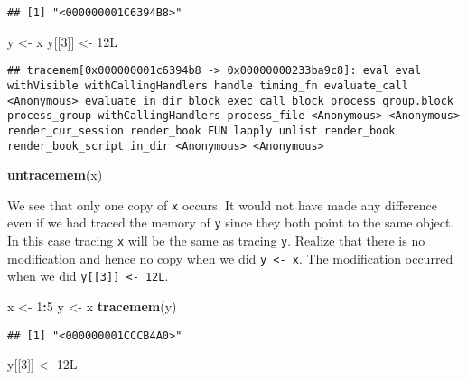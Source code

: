 \documentclass[]{book}
\newenvironment{Shaded}{\begin{snugshade}}{\end{snugshade}}
\newcommand{\DecValTok}[1]{\textcolor[rgb]{0.00,0.00,0.81}{#1}}
\newcommand{\KeywordTok}[1]{\textcolor[rgb]{0.13,0.29,0.53}{\textbf{#1}}}
\newcommand{\NormalTok}[1]{#1}
\newcommand{\OperatorTok}[1]{\textcolor[rgb]{0.81,0.36,0.00}{\textbf{#1}}}
\newcommand{\StringTok}[1]{\textcolor[rgb]{0.31,0.60,0.02}{#1}}
\begin{document}
\begin{verbatim}
## [1] "<000000001C6394B8>"
\end{verbatim}

\begin{Shaded}
\begin{Highlighting}[]
\NormalTok{y <-}\StringTok{ }\NormalTok{x}
\NormalTok{y[[}\DecValTok{3}\NormalTok{]] <-}\StringTok{ }\NormalTok{12L}
\end{Highlighting}
\end{Shaded}

\begin{verbatim}
## tracemem[0x000000001c6394b8 -> 0x00000000233ba9c8]: eval eval withVisible withCallingHandlers handle timing_fn evaluate_call <Anonymous> evaluate in_dir block_exec call_block process_group.block process_group withCallingHandlers process_file <Anonymous> <Anonymous> render_cur_session render_book FUN lapply unlist render_book render_book_script in_dir <Anonymous> <Anonymous>
\end{verbatim}

\begin{Shaded}
\begin{Highlighting}[]
\KeywordTok{untracemem}\NormalTok{(x)}
\end{Highlighting}
\end{Shaded}

We see that only one copy of \texttt{x} occurs. It would not have made any difference even if we had traced the memory of \texttt{y} since they both point to the same object. In this case tracing \texttt{x} will be the same as tracing \texttt{y}. Realize that there is no modification and hence no copy when we did \texttt{y\ \textless{}-\ x}. The modification occurred when we did \texttt{y{[}{[}3{]}{]}\ \textless{}-\ 12L}.

\begin{Shaded}
\begin{Highlighting}[]
\NormalTok{x <-}\StringTok{ }\DecValTok{1}\OperatorTok{:}\DecValTok{5}
\NormalTok{y <-}\StringTok{ }\NormalTok{x}
\KeywordTok{tracemem}\NormalTok{(y)}
\end{Highlighting}
\end{Shaded}

\begin{verbatim}
## [1] "<000000001CCCB4A0>"
\end{verbatim}

\begin{Shaded}
\begin{Highlighting}[]
\NormalTok{y[[}\DecValTok{3}\NormalTok{]] <-}\StringTok{ }\NormalTok{12L}
\end{Highlighting}
\end{Shaded}
\end{document}
